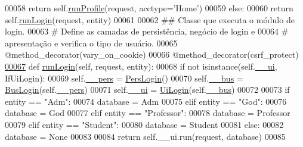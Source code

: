\begin{DoxyCode}
00058                 \textcolor{keywordflow}{return} self.\hyperlink{classELO_1_1MainUnit_1_1Factory_ab20a76f74180fc77c6b8fcd8de7942f1}{runProfile}(request, acctype=\textcolor{stringliteral}{'Home'})
00059         \textcolor{keywordflow}{else}:
00060             \textcolor{keywordflow}{return} self.\hyperlink{classELO_1_1MainUnit_1_1Factory_a2d2e0e20ae0e92c1598c0fcab23a705a}{runLogin}(request, entity)
00061 
00062     \textcolor{comment}{## Classe que executa o módulo de login.}
00063     \textcolor{comment}{#   Define as camadas de persistência, negócio de login e}
00064     \textcolor{comment}{#   apresentação e verifica o tipo de usuário.}
00065     @method\_decorator(vary\_on\_cookie)
00066     @method\_decorator(csrf\_protect)
\hypertarget{MainUnit_8py_source_l00067}{}\hyperlink{classELO_1_1MainUnit_1_1Factory_a2d2e0e20ae0e92c1598c0fcab23a705a}{00067}     \textcolor{keyword}{def }\hyperlink{classELO_1_1MainUnit_1_1Factory_a2d2e0e20ae0e92c1598c0fcab23a705a}{runLogin}(self, request, entity):
00068         \textcolor{keywordflow}{if} \textcolor{keywordflow}{not} isinstance(self.\hyperlink{classELO_1_1MainUnit_1_1Factory_a189a44a11e1a66ba69663eb2c598dd7c}{\_\_ui}, IfUiLogin):
00069             self.\hyperlink{classELO_1_1MainUnit_1_1Factory_a68f6640ad3b515e1b8cd48d1554c0779}{\_\_pers} = \hyperlink{classLogin_1_1LoginUnit_1_1PersLogin}{PersLogin}()
00070             self.\hyperlink{classELO_1_1MainUnit_1_1Factory_a6a0b7b93046e095779ba54e0a8a4d02c}{\_\_bus} = \hyperlink{classLogin_1_1LoginUnit_1_1BusLogin}{BusLogin}(self.\hyperlink{classELO_1_1MainUnit_1_1Factory_a68f6640ad3b515e1b8cd48d1554c0779}{\_\_pers})
00071             self.\hyperlink{classELO_1_1MainUnit_1_1Factory_a189a44a11e1a66ba69663eb2c598dd7c}{\_\_ui} = \hyperlink{classLogin_1_1LoginUnit_1_1UiLogin}{UiLogin}(self.\hyperlink{classELO_1_1MainUnit_1_1Factory_a6a0b7b93046e095779ba54e0a8a4d02c}{\_\_bus})
00072 
00073         \textcolor{keywordflow}{if} entity == \textcolor{stringliteral}{"Adm"}:
00074             database = Adm
00075         \textcolor{keywordflow}{elif} entity == \textcolor{stringliteral}{"God"}:
00076             database = God
00077         \textcolor{keywordflow}{elif} entity == \textcolor{stringliteral}{"Professor"}:
00078             database = Professor
00079         \textcolor{keywordflow}{elif} entity == \textcolor{stringliteral}{"Student"}:
00080             database = Student
00081         \textcolor{keywordflow}{else}:
00082             database = \textcolor{keywordtype}{None}
00083 
00084         \textcolor{keywordflow}{return} self.\_\_ui.run(request, database)
00085 

\end{DoxyCode}
